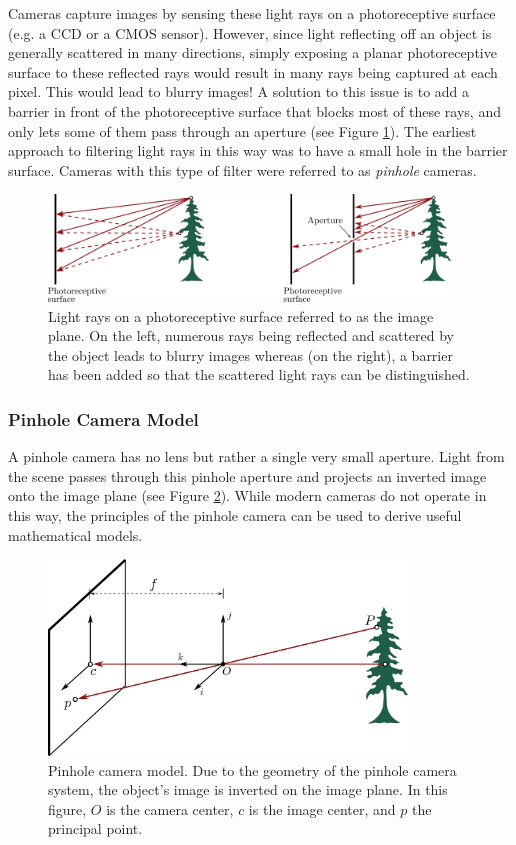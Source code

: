 Cameras capture images by sensing these light rays on a photoreceptive surface (e.g. a CCD or a CMOS sensor). However, since light reflecting off an object is generally scattered in many directions, simply exposing a planar photoreceptive surface to these reflected rays would result in many rays being captured at each pixel. This would lead to blurry images! A solution to this issue is to add a barrier in front of the photoreceptive surface that blocks most of these rays, and only lets some of them pass through an aperture (see Figure \ref{fig:LightRays}). 
The earliest approach to filtering light rays in this way was to have a small hole in the barrier surface. Cameras with this type of filter were referred to as \textit{pinhole} cameras.
\begin{figure}[ht]
\centering
\includegraphics[width=0.95\textwidth]{tex/figs/ch07_figs/pinhole.png}
\caption{Light rays on a photoreceptive surface referred to as the image plane. On the left, numerous rays being reflected and scattered by the object leads to blurry images whereas (on the right), a barrier has been added so that the scattered light rays can be distinguished.}
\label{fig:LightRays}
\end{figure}


\subsubsection{Pinhole Camera Model} 
A pinhole camera has no lens but rather a single very small aperture. Light from the scene passes through this pinhole aperture and projects an inverted image onto the image plane (see Figure \ref{fig:PinholeMath}). While modern cameras do not operate in this way, the principles of the pinhole camera can be used to derive useful mathematical models. 

\begin{figure}[ht]
\centering
\includegraphics[width=0.85\textwidth]{tex/figs/ch07_figs/pinholecamera.png}
\caption{Pinhole camera model. Due to the geometry of the pinhole camera system, the object's image is inverted on the image plane. In this figure, $O$ is the camera center, $c$ is the image center, and $p$ the principal point.}
\label{fig:PinholeMath}
\end{figure}

